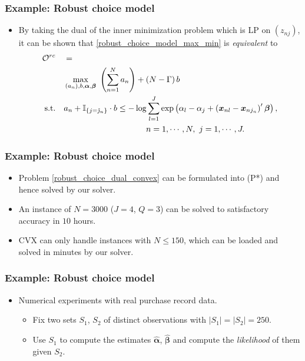 \documentclass{beamer}
\begin{document}
\begin{frame}
	\frametitle{Example: Robust choice model}
	\begin{itemize}
		\item By taking the dual of the inner minimization problem which is LP on $\left(z_{nj}\right)$, it can be shown that \eqref{robust_choice_model_max_min} is \textit{equivalent} to
		\begin{align}\label{robust_choice_dual_convex}
		\begin{split}
		\mathcal{O}^{rc}\quad  &=\quad 
		\\&\max_{\left(a_n\right),b, \boldsymbol{\alpha}, \boldsymbol{\beta}}\  \left(\sum_{n=1}^N a_n\right)+\left(N-\Gamma\right)b \\
		\textnormal{s.t.}\quad & a_n +  \mathbb{I}_{\left\{j=\hat{\jmath}_n\right\}}\cdot b \leq -\log \sum_{l=1}^J \exp\left(\alpha_l - \alpha_j + \left(\boldsymbol{x}_{nl}-\boldsymbol{x}_{nj_n}\right)'\boldsymbol{\beta}\right),\\ &\quad \quad \quad \quad \quad \quad \quad \quad \quad \quad n=1,\cdots, N,\ j=1,\cdots, J. \\
		\end{split}
		\end{align}
	\end{itemize}
\end{frame}

\begin{frame}
	\frametitle{Example: Robust choice model}
	\begin{itemize}
		\item Problem \eqref{robust_choice_dual_convex} can be formulated into (P*) and hence solved by our solver. 
		\item An instance of $N=3000$ ($J=4$, $Q=3$) can be solved to satisfactory accuracy in $10$ hours.
		\item CVX can only handle instances with $N\leq 150$, which can be loaded and solved in minutes by our solver.
	\end{itemize}
\end{frame}

\begin{frame}
	\frametitle{Example: Robust choice model}
	\begin{itemize}
		\item Numerical experiments with real purchase record data.
		\begin{itemize}
			\item Fix two sets $S_1$, $S_2$ of distinct observations with $|S_1|=|S_2|=250$.
			\item Use $S_1$ to compute the estimates $\hat{\boldsymbol{\alpha}}$, $\hat{\boldsymbol{\beta}}$ and compute the \textit{likelihood} of them given $S_2$.
		\end{itemize}
	\end{itemize}
\end{frame}
\end{document}
